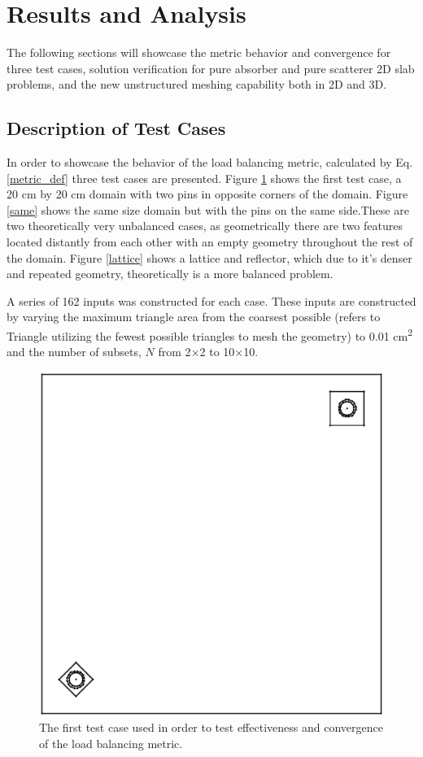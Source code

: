 \documentclass{anstrans}
\begin{document}
\section{Results and Analysis}

The following sections will showcase the metric behavior and convergence for three test cases, solution verification for pure absorber and pure scatterer 2D slab problems, and the new unstructured meshing capability both in 2D and 3D.

\subsection{Description of Test Cases}
\label{sec:convergence}
In order to showcase the behavior of the load balancing metric, calculated by Eq. \ref{metric_def} three test cases are presented. Figure \ref{opp} shows the first test case, a 20 cm by 20 cm domain with two pins in opposite corners of the domain. Figure \ref{same} shows the same size domain but with the pins on the same side.These are two theoretically very unbalanced cases, as geometrically there are two features located distantly from each other with an empty geometry throughout the rest of the domain. Figure \ref{lattice} shows a lattice and reflector, which due to it's denser and repeated geometry, theoretically is a more balanced problem. 

A series of 162 inputs was constructed for each case. These inputs are constructed by varying the maximum triangle area from the coarsest possible (refers to Triangle utilizing the fewest possible triangles to mesh the geometry) to 0.01 cm\textsuperscript{2} and the number of subsets, $N$ from 2$\times$2 to 10$\times$10.
\begin{figure}
\centering
\includegraphics[scale = 0.5]{figures/unbalanced_lattice.eps}
\caption{The first test case used in order to test effectiveness and convergence of the load balancing metric.}
\label{opp}
\end{figure}
\end{document}
